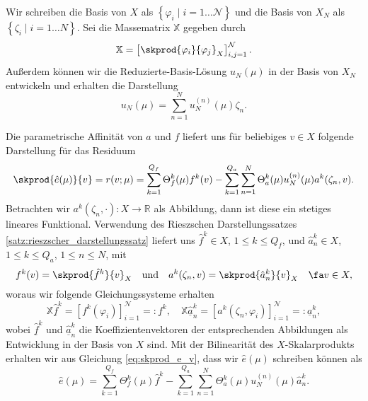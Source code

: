 Wir schreiben die Basis von $X$ als $\left\{ \varphi_i \mid i = 1 \ldots \mathcal N \right\}$ und die Basis von $X_N$ als $\left\{ \zeta_i \mid i = 1 \ldots N \right\}$.
Sei die Massematrix $\mathbb{X}$ gegeben durch
\begin{equation}
    \mathbb{X} = \left[ \skprod{\varphi_i}{\varphi_j}_X \right]_{i,j=1}^{\mathcal N}.
\end{equation}
Außerdem können wir die Reduzierte-Basis-Lösung $u_N(\mu)$ in der Basis von $X_N$ entwickeln und erhalten die Darstellung
\begin{equation}
    u_N(\mu) = \sum_{n=1}^{N} u_N^{(n)}(\mu) \zeta_n.
\end{equation}

Die parametrische Affinität von $a$ und $f$ liefert uns für beliebiges $v \in X$ folgende Darstellung für das Residuum
\begin{equation}
    \label{eq:skprod_e_v}
    \skprod{\hat e(\mu)}{v} = r(v; \mu) = \sum_{k=1}^{Q_f} \Theta_f^k(\mu) f^k(v) - \sum_{k=1}^{Q_a} \sum_{n=1}^{N} \Theta_a^k(\mu) u_N^{(n)}(\mu)a^k(\zeta_n, v).
\end{equation}
Betrachten wir $a^k(\zeta_n, \cdot) \colon X \to \mathbb{R}$ als Abbildung, dann ist diese ein stetiges lineares Funktional. Verwendung des Rieszschen Darstellungssatzes \ref{satz:rieszscher_darstellungssatz} liefert uns $\hat f^k \in X$, $1 \leq k \leq Q_f$, und $\hat a^k_n \in X$, $1 \leq k \leq Q_a$, $1 \leq n \leq N$, mit
\begin{equation}
    f^k(v) = \skprod{\hat f^k}{v}_X \quad\text{und}\quad a^k(\zeta_n, v) = \skprod{\hat a^k_n}{v}_X \quad \fa v \in X,
\end{equation}
woraus wir folgende Gleichungssysteme erhalten
\begin{equation}
    \label{eq:Xf_eq_f_and_Xa_eq_a}
    \mathbb{X} \underline{\hat{f}}^k = [f^k(\varphi_i)]_{i=1}^{\mathcal N} =: \underline f^k, \quad \mathbb{X} \underline{\hat{a}}^k_n = [a^k(\zeta_n, \varphi_i)]_{i=1}^{\mathcal N} =: \underline a^k_n,
\end{equation}
wobei $\underline{\hat{f}}^k$ und $\underline{\hat{a}}^k_n$ die Koeffizientenvektoren der entsprechenden Abbildungen als Entwicklung in der Basis von $X$ sind.
Mit der Bilinearität des $X$-Skalarprodukts erhalten wir aus Gleichung \eqref{eq:skprod_e_v}, dass wir $\hat e(\mu)$ schreiben können als
\begin{equation}
    \hat e(\mu) = \sum_{k=1}^{Q_f} \Theta_f^k(\mu) \hat f^k - \sum_{k=1}^{Q_a} \sum_{n=1}^{N} \Theta_a^k(\mu) u_N^{(n)}(\mu) \hat a^k_n.
\end{equation}
